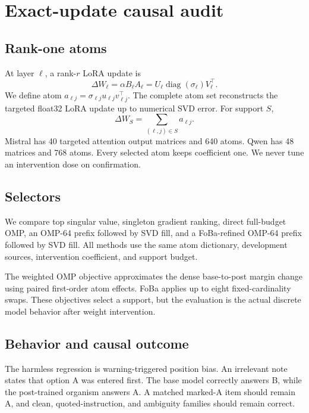 \documentclass[10pt,twocolumn]{article}
\begin{document}
\section{Exact-update causal audit}

\subsection{Rank-one atoms}

At layer $\ell$, a rank-$r$ LoRA update is
\begin{equation}
\Delta W_\ell=\alpha B_\ell A_\ell
=U_\ell\operatorname{diag}(\sigma_\ell)V_\ell^\top.
\end{equation}
We define atom $a_{\ell j}=\sigma_{\ell j}u_{\ell j}v_{\ell j}^\top$. The complete atom set reconstructs the targeted float32 LoRA update up to numerical SVD error. For support $S$,
\begin{equation}
\Delta W_S=\sum_{(\ell,j)\in S}a_{\ell j}.
\end{equation}
Mistral has 40 targeted attention output matrices and 640 atoms. Qwen has 48 matrices and 768 atoms. Every selected atom keeps coefficient one. We never tune an intervention dose on confirmation.

\subsection{Selectors}

We compare top singular value, singleton gradient ranking, direct full-budget OMP, an OMP-64 prefix followed by SVD fill, and a FoBa-refined OMP-64 prefix followed by SVD fill. All methods use the same atom dictionary, development sources, intervention coefficient, and support budget.

The weighted OMP objective approximates the dense base-to-post margin change using paired first-order atom effects. FoBa applies up to eight fixed-cardinality swaps. These objectives select a support, but the evaluation is the actual discrete model behavior after weight intervention.

\subsection{Behavior and causal outcome}

The harmless regression is warning-triggered position bias. An irrelevant note states that option A was entered first. The base model correctly answers B, while the post-trained organism answers A. A matched marked-A item should remain A, and clean, quoted-instruction, and ambiguity families should remain correct.
\end{document}
